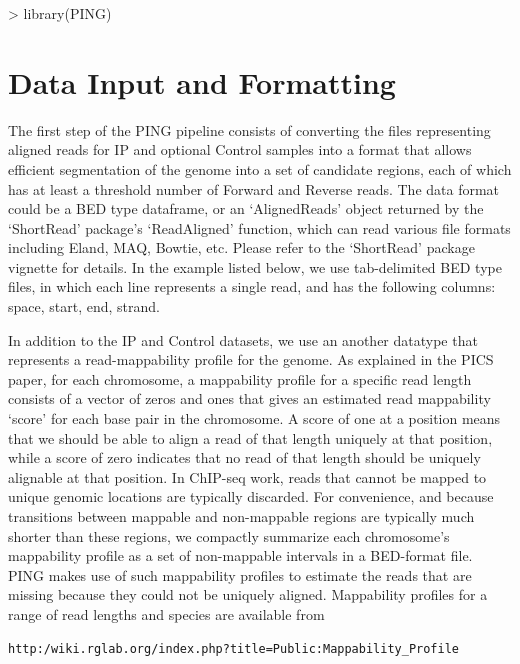 \documentclass[11pt]{article}
\begin{document}
\begin{Schunk}
\begin{Sinput}
> library(PING)
\end{Sinput}
\end{Schunk}

\section{Data Input and Formatting}
The first step of the PING pipeline consists of converting the files representing aligned reads for IP and optional Control samples into a format that allows efficient segmentation of the genome into a set of candidate regions, each of which has at least a threshold number of Forward and Reverse reads. The data format could be a BED type dataframe, or an `AlignedReads' object returned by the `ShortRead' package's `ReadAligned' function, which can read various file formats including Eland, MAQ, Bowtie, etc. Please refer to the `ShortRead' package vignette for details.
In the example listed below, we use tab-delimited BED type files, in which each line represents a single read, and has the following columns: space, start, end, strand. 

In addition to the IP and Control datasets, we use an another datatype that represents a read-mappability profile for the genome. 
As explained in the PICS paper, for each chromosome, a mappability profile for a specific read length consists of a vector of zeros and ones that gives an estimated read mappability `score' for each base pair in the chromosome. A score of one at a position means that we should be able to align a read of that length uniquely at that position, while a score of zero indicates that no read of that length should be uniquely alignable at that position. In ChIP-seq work, reads that cannot be mapped to unique genomic locations are typically discarded. For convenience, and because transitions between mappable and non-mappable regions are typically much shorter than these regions, we compactly summarize each chromosome's mappability profile as a set of 
non-mappable intervals in a BED-format file. 
PING makes use of such mappability profiles to estimate the reads that are missing because they could not be uniquely aligned. 
Mappability profiles for a range of read lengths and species are available from \begin{verbatim}
http:/wiki.rglab.org/index.php?title=Public:Mappability_Profile
\end{verbatim}
\end{document}
